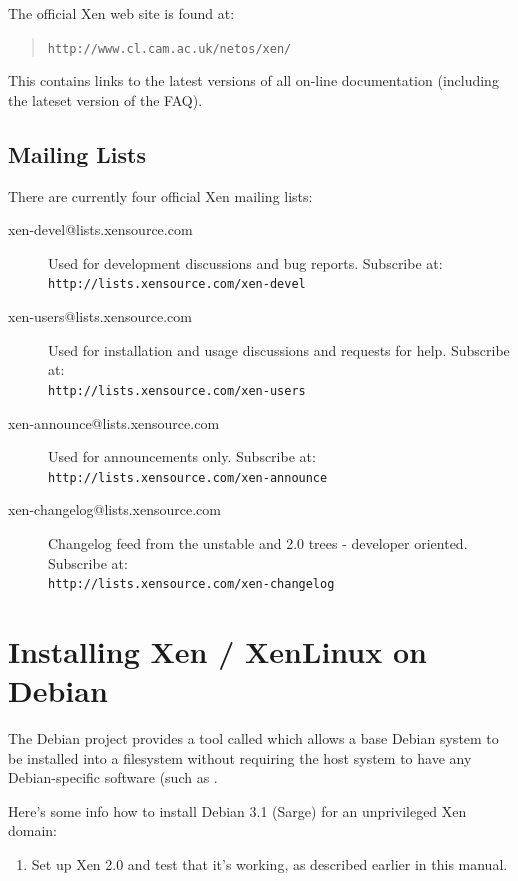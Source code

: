 \documentclass[11pt,twoside,final,openright]{report}
\begin{document}
{The official Xen web site is found at:
\begin{quote}
{\tt http://www.cl.cam.ac.uk/netos/xen/}
\end{quote}

This contains links to the latest versions of all on-line 
documentation (including the lateset version of the FAQ). 

\section{Mailing Lists}

There are currently four official Xen mailing lists:

\begin{description}
\item[xen-devel@lists.xensource.com] Used for development
discussions and bug reports.  Subscribe at: \\
{\small {\tt http://lists.xensource.com/xen-devel}}
\item[xen-users@lists.xensource.com] Used for installation and usage
discussions and requests for help.  Subscribe at: \\
{\small {\tt http://lists.xensource.com/xen-users}}
\item[xen-announce@lists.xensource.com] Used for announcements only.
Subscribe at: \\
{\small {\tt http://lists.xensource.com/xen-announce}}
\item[xen-changelog@lists.xensource.com]  Changelog feed
from the unstable and 2.0 trees - developer oriented.  Subscribe at: \\
{\small {\tt http://lists.xensource.com/xen-changelog}}
\end{description}


\appendix


\chapter{Installing Xen / XenLinux on Debian}

The Debian project provides a tool called  which
allows a base Debian system to be installed into a filesystem without
requiring the host system to have any Debian-specific software (such
as . 

Here's some info how to install Debian 3.1 (Sarge) for an unprivileged
Xen domain:

\begin{enumerate}
\item Set up Xen 2.0 and test that it's working, as described earlier in
      this manual.


\end{enumerate}}
\end{document}
